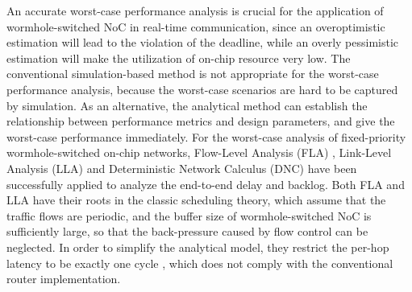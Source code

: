 \documentclass[10pt,journal]{IEEEtran}
\begin{document}
An accurate worst-case performance analysis is crucial for the application of wormhole-switched NoC in real-time communication, since an overoptimistic estimation will lead to the violation of the deadline, while an overly pessimistic estimation will make the utilization of on-chip resource very low. The conventional simulation-based method is not appropriate for the worst-case performance analysis, because the worst-case scenarios are hard to be captured by simulation. As an alternative, the analytical method can establish the relationship between performance metrics and design parameters, and give the worst-case performance immediately. For the worst-case analysis of fixed-priority wormhole-switched on-chip networks, Flow-Level Analysis (FLA) \cite{Shi:2008:RCA:1397757.1397996}, Link-Level Analysis (LLA) \cite{73}\cite{189} and Deterministic Network Calculus (DNC) \cite{Qian489900} have been successfully applied to analyze the end-to-end delay and backlog. Both FLA and LLA have their roots in the classic scheduling theory, which assume that the traffic flows are periodic, and the buffer size of wormhole-switched NoC is sufficiently large, so that the back-pressure caused by flow control can be neglected. In order to simplify the analytical model, they restrict the per-hop latency to be exactly one cycle \cite{Shi:2008:RCA:1397757.1397996}\cite{73}\cite{189}, which does not comply with the conventional router implementation.
\end{document}
